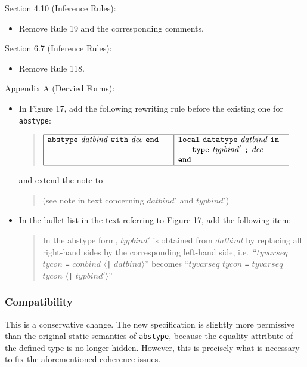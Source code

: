 \documentclass[twoside,titlepage]{article}
\begin{document}
\begin{appendix}
Section 4.10 (Inference Rules):
\begin{itemize}
\item Remove Rule 19 and the corresponding comments.
\end{itemize}

Section 6.7 (Inference Rules):
\begin{itemize}
\item Remove Rule 118.
\end{itemize}

Appendix A (Dervied Forms):
\begin{itemize}
\item In Figure 17, add the following rewriting rule before the existing one for {\tt abstype}:
  \begin{quote}
  $\begin{array}{|l|l|}
  \hline
  {\tt{abstype}}~\mathit{datbind}~{\tt{with}}~\mathit{dec}~{\tt{end}}~~~~
  & {\tt{local}}~{\tt{datatype}}~\mathit{datbind}~{\tt{in}}~~ \\
  & ~~~~~{\tt{type}}~\mathit{typbind}'~\mbox{\tt;}~\mathit{dec} \\
  & {\tt{end}} \\
  \hline
  \end{array}$
  \end{quote}
  and extend the note to 
  \begin{quote}
  (see note in text concerning $\mathit{datbind}'$ and $\mathit{typbind}'$)
  \end{quote}

\item In the bullet list in the text referring to Figure 17, add the following item: 
  \begin{quote}
  In the abstype form, $\mathit{typbind}'$ is obtained from $\mathit{datbind}$ by replacing all right-hand sides by the corresponding left-hand side, i.e.\ ``$\mathit{tyvarseq}$ $\mathit{tycon}$ {\tt=} $\mathit{conbind}$ $\langle${\tt|} $\mathit{datbind}\rangle$'' becomes ``$\mathit{tyvarseq}$ $\mathit{tycon}$ {\tt=} $\mathit{tyvarseq}$ $\mathit{tycon}$ $\langle${\tt|} $\mathit{typbind}'\rangle$'' 
  \end{quote}

\end{itemize}

\subsubsection*{Compatibility}

This is a conservative change. The new specification is slightly more permissive than the original static semantics of {\tt abstype}, because the equality attribute of the defined type is no longer hidden. However, this is precisely what is necessary to fix the aforementioned coherence issues.


\end{appendix}
\end{document}

